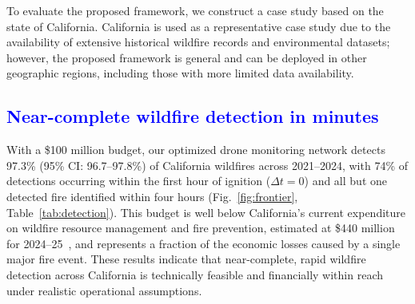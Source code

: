\documentclass[pdflatex,sn-mathphys-num]{sn-jnl}%
\theoremstyle{thmstyleone}%
\theoremstyle{thmstyletwo}%
\theoremstyle{thmstylethree}%
\newcommand{\blue}[1]{\textcolor{blue}{#1}}
\begin{document}
To evaluate the proposed framework, we construct a case study based on the state of California. California is used as a representative case study due to the availability of extensive historical wildfire records and environmental datasets; however, the proposed framework is general and can be deployed in other geographic regions, including those with more limited data availability. 

\blue{\subsection*{Near-complete wildfire detection in minutes}}
\noindent With a \$100 million budget, our optimized drone monitoring network detects 97.3\% (95\% CI: 96.7--97.8\%) of California wildfires across 2021--2024, with 74\% of detections occurring within the first hour of ignition ($\Delta t = 0$) and all but one detected fire identified within four hours (Fig.~\ref{fig:frontier}, Table~\ref{tab:detection}). This budget is well below California's current expenditure on wildfire resource management and fire prevention, estimated at \$440 million for 2024--25~\cite{next10_rebuilding_resilient_2021}, and represents a fraction of the economic losses caused by a single major fire event. These results indicate that near-complete, rapid wildfire detection across California is technically feasible and financially within reach under realistic operational assumptions.
\end{document}
